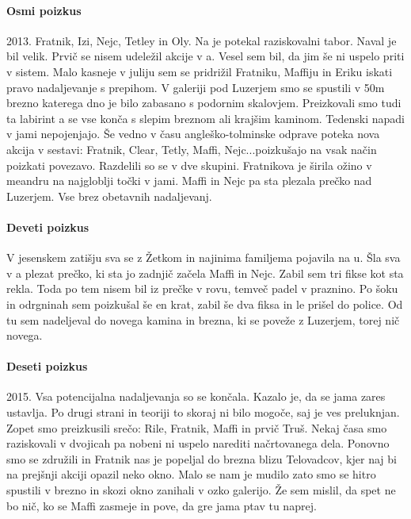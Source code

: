 \paragraph{Osmi poizkus} 2013. Fratnik, Izi, Nejc, Tetley in Oly. Na  je potekal raziskovalni tabor. Naval je bil velik. Prvič se nisem udeležil akcije v a. Vesel sem bil, da jim še ni uspelo priti v sistem. Malo kasneje v juliju sem se pridrižil Fratniku, Maffiju in Eriku iskati pravo nadaljevanje s prepihom.  V galeriji pod Luzerjem smo se spustili v 50m brezno  katerega dno je bilo zabasano s podornim skalovjem. Preizkovali smo tudi ta labirint a se vse konča s slepim breznom ali krajšim kaminom. Tedenski napadi v jami nepojenjajo. Še vedno v času angleško-tolminske odprave poteka nova akcija v sestavi:  Fratnik, Clear, Tetly, Maffi, Nejc...poizkušajo na vsak način poizkati povezavo. Razdelili so se v dve skupini. Fratnikova je širila ožino v meandru na najgloblji točki v jami. Maffi in Nejc pa sta plezala prečko nad Luzerjem. Vse brez obetavnih nadaljevanj. 

\paragraph{Deveti poizkus} V jesenskem zatišju sva se z Žetkom in najinima familjema pojavila na u. Šla sva v a plezat prečko, ki sta jo zadnjič začela Maffi in Nejc. Zabil sem tri fikse kot sta rekla. Toda po tem nisem bil iz prečke v rovu,  temveč padel v praznino. Po šoku in odrgninah sem poizkušal še en krat, zabil še dva fiksa in le prišel do police. Od tu sem nadeljeval do novega kamina in brezna, ki se poveže z Luzerjem, torej nič novega. 

\paragraph{Deseti poizkus} 2015. Vsa potencijalna nadaljevanja so se končala. Kazalo je, da se jama zares ustavlja. Po drugi strani in teoriji to skoraj ni bilo mogoče, saj je  ves preluknjan. Zopet smo preizkusili srečo: Rile, Fratnik, Maffi in prvič Truš. Nekaj časa smo raziskovali v dvojicah pa nobeni ni uspelo narediti načrtovanega dela. Ponovno smo se združili in Fratnik nas je popeljal do brezna blizu Telovadcov, kjer naj bi na prejšnji akciji opazil neko okno. Malo se nam je mudilo zato smo se hitro spustili v brezno in skozi okno zanihali v ozko galerijo. Že sem mislil, da spet ne bo nič, ko se Maffi zasmeje in pove, da gre jama ptav tu naprej. 


